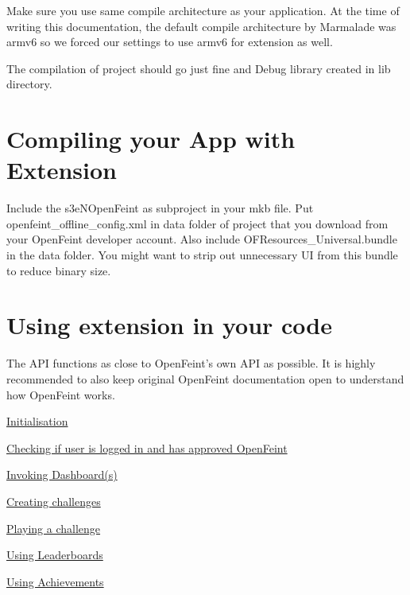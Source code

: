Make sure you use same compile architecture as your application. At the time of writing this documentation, the default compile architecture by Marmalade was armv6 so we forced our settings to use armv6 for extension as well.



The compilation of project should go just fine and Debug library created in lib directory.\hypertarget{index_sec_3}{}\section{Compiling your App with Extension}\label{index_sec_3}
Include the s3eNOpenFeint as subproject in your mkb file. Put openfeint\_\-offline\_\-config.xml in data folder of project that you download from your OpenFeint developer account. Also include OFResources\_\-Universal.bundle in the data folder. You might want to strip out unnecessary UI from this bundle to reduce binary size.\hypertarget{index_sec_4}{}\section{Using extension in your code}\label{index_sec_4}
The API functions as close to OpenFeint's own API as possible. It is highly recommended to also keep original OpenFeint documentation open to understand how OpenFeint works.

\hyperlink{index_sec_4_1}{Initialisation}

\hyperlink{index_sec_4_2}{Checking if user is logged in and has approved OpenFeint}

\hyperlink{index_sec_4_3}{Invoking Dashboard(s)}

\hyperlink{index_sec_4_4}{Creating challenges}

\hyperlink{index_sec_4_5}{Playing a challenge}

\hyperlink{index_sec_4_6}{Using Leaderboards}

\hyperlink{index_sec_4_7}{Using Achievements}

